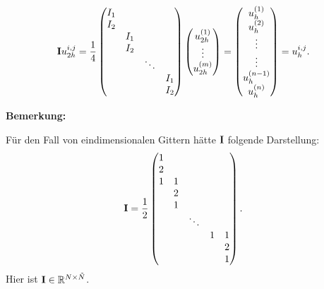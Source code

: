 \begin{equation}
{\textbf{I}}u^{i,j}_{2h} = \frac {1} {4}
\begin{pmatrix}
I_{1} & & &\\
I_{2} & & &\\
& I_{1} & &\\
& I_{2} & &\\
& & \ddots &\\
& & & I_{1}\\
& & & I_{2}
\end{pmatrix}
\begin{pmatrix}
u_{2h}^{(1)} \\
\vdots \\
u_{2h}^{(m)}
\end{pmatrix} =
\begin{pmatrix}
u_{h}^{(1)} \\
u_{h}^{(2)} \\
\vdots \\
\vdots \\
u_{h}^{(n-1)}\\
u_{h}^{(n)}
\end{pmatrix} =
u^{i,j}_{h}.
\end{equation}

\textbf{Bemerkung:}

Für den Fall von eindimensionalen Gittern hätte ${\textbf{I}}$ folgende Darstellung:
\begin{equation}
{\textbf{I}} = \frac {1} {2}
\begin{pmatrix}
1\\
2\\
1 & 1\\
  & 2\\
  & 1\\
  &   & \ddots\\
  &   &          & 1 & 1\\
  &   &          &   & 2\\
  &   &          &   & 1
\end{pmatrix}.
\end{equation}
Hier ist ${\textbf{I}} \in \mathbb{R}^{N \times \tilde N}$.

\label{img.Prolongation}


